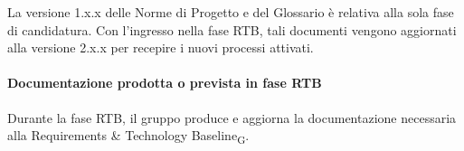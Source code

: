 \bigskip

La versione 1.x.x delle Norme di Progetto e del Glossario è relativa alla sola
fase di candidatura. Con l'ingresso nella fase RTB, tali documenti vengono
aggiornati alla versione 2.x.x per recepire i nuovi processi attivati.


\paragraph{Documentazione prodotta o prevista in fase RTB}

Durante la fase RTB, il gruppo produce e aggiorna la documentazione necessaria
alla Requirements \& Technology Baseline\textsubscript{G}.

\bigskip

